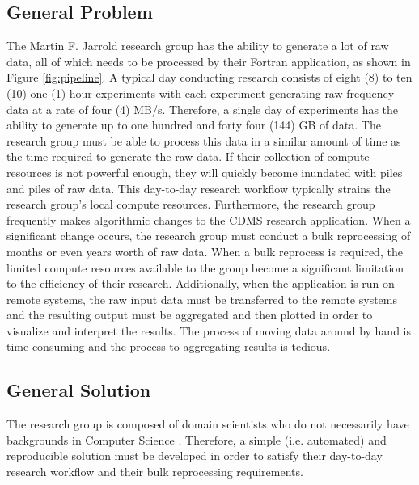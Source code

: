 \documentclass[9pt,twocolumn,twoside]{../../styles/osajnl}
\begin{document}
\subsection{General Problem} \label{problem}
The Martin F. Jarrold research group has the ability to generate a lot
of raw data, all of which needs to be processed by their Fortran
application, as shown in Figure \ref{fig:pipeline}. A typical day
conducting research consists of eight (8) to ten (10) one (1) hour
experiments with each experiment generating raw frequency data at a
rate of four (4) MB/s. Therefore, a single day of experiments has the
ability to generate up to one hundred and forty four (144) GB of
data. The research group must be able to process this data in a
similar amount of time as the time required to generate the raw
data. If their collection of compute resources is not powerful enough,
they will quickly become inundated with piles and piles of raw
data. This day-to-day research workflow typically strains the research
group's local compute resources. Furthermore, the research group
frequently makes algorithmic changes to the CDMS research
application. When a significant change occurs, the research group must
conduct a bulk reprocessing of months or even years worth of raw
data. When a bulk reprocess is required, the limited compute resources
available to the group become a significant limitation to the
efficiency of their research. Additionally, when the application is
run on remote systems, the raw input data must be transferred to the
remote systems and the resulting output must be aggregated and then
plotted in order to visualize and interpret the results. The process
of moving data around by hand is time consuming and the process to
aggregating results is tedious.

\subsection{General Solution} \label{solution}
The research group is composed of domain scientists who do not
necessarily have backgrounds in Computer Science
\cite{www-mfjgroup}. Therefore, a simple (i.e. automated) and
reproducible solution must be developed in order to satisfy their
day-to-day research workflow and their bulk reprocessing requirements.
\end{document}

